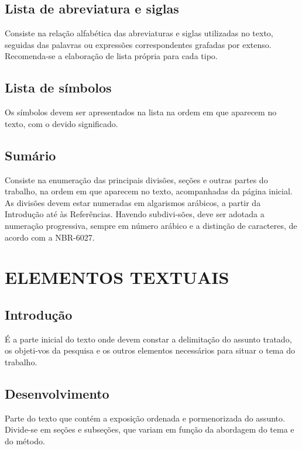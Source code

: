 \subsection{Lista de abreviatura e siglas}

Consiste na relação alfabética das abreviaturas e siglas
utilizadas no texto, seguidas das palavras ou expressões correspondentes grafadas por extenso. Recomenda-se a elaboração de lista própria para cada tipo.

\subsection{Lista de símbolos}

Os símbolos devem ser apresentados na lista na ordem em que
aparecem no texto, com o devido significado.

\subsection{Sumário}

Consiste na enumeração das principais divisões, seções e outras
partes do trabalho, na ordem em que aparecem no texto, acompanhadas da página inicial. As divisões devem estar numeradas em algarismos arábicos, a partir da Introdução até às Referências. Havendo subdivi-sões, deve ser adotada a numeração progressiva, sempre em número arábico e a distinção de caracteres, de acordo com a NBR-6027.

\section{ELEMENTOS TEXTUAIS}

\subsection{Introdução}

É a parte inicial do texto onde devem constar a delimitação do
assunto tratado, os objeti-vos da pesquisa e os outros elementos necessários para situar o tema do trabalho.

\subsection{Desenvolvimento}

Parte do texto que contém a exposição ordenada e pormenorizada do
assunto. Divide-se em seções e subseções, que variam em função da abordagem do tema e do método.

